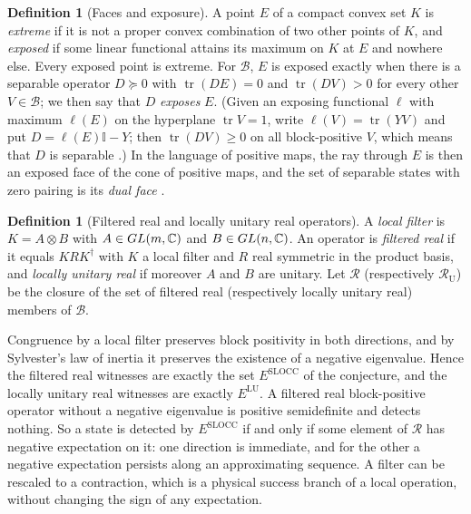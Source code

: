 \documentclass[11pt,a4paper]{article}
\theoremstyle{definition}\newtheorem{definition}[theorem]{Definition}\newtheorem*{conj}{Conjecture 9 of Shen, Chen and Bian}\newtheorem{remark}[theorem]{Remark}
\newcommand{\tr}{\operatorname{tr}}\newcommand{\im}{\operatorname{Im}}\newcommand{\adj}{\operatorname{adj}}\newcommand{\id}{\mathbb I}
\newcommand{\cB}{\mathcal B}\newcommand{\cR}{\mathcal R}\newcommand{\vecm}{\mathrm{vec}}
\begin{document}
\begin{definition}[Faces and exposure]
A point $E$ of a compact convex set $K$ is \emph{extreme} if it is not a proper convex combination of two other points of $K$, and \emph{exposed} if some linear functional attains its maximum on $K$ at $E$ and nowhere else. Every exposed point is extreme. For $\cB$, $E$ is exposed exactly when there is a separable operator $D\succeq0$ with $\tr(DE)=0$ and $\tr(DV)>0$ for every other $V\in\cB$; we then say that $D$ \emph{exposes} $E$. (Given an exposing functional $\ell$ with maximum $\ell(E)$ on the hyperplane $\tr V=1$, write $\ell(V)=\tr(YV)$ and put $D=\ell(E)\id-Y$; then $\tr(DV)\geq0$ on all block-positive $V$, which means that $D$ is separable \cite{horodecki}.) In the language of positive maps, the ray through $E$ is then an exposed face of the cone of positive maps, and the set of separable states with zero pairing is its \emph{dual face} \cite{hakye}.
\end{definition}

\begin{definition}[Filtered real and locally unitary real operators]
A \emph{local filter} is $K=A\otimes B$ with $A\in GL(m,\mathbb C)$ and $B\in GL(n,\mathbb C)$. An operator is \emph{filtered real} if it equals $KRK^\dagger$ with $K$ a local filter and $R$ real symmetric in the product basis, and \emph{locally unitary real} if moreover $A$ and $B$ are unitary. Let $\cR$ (respectively $\cR_{\mathrm U}$) be the closure of the set of filtered real (respectively locally unitary real) members of $\cB$.
\end{definition}

Congruence by a local filter preserves block positivity in both directions, and by Sylvester's law of inertia it preserves the existence of a negative eigenvalue. Hence the filtered real witnesses are exactly the set $E^{\mathrm{SLOCC}}$ of the conjecture, and the locally unitary real witnesses are exactly $E^{\mathrm{LU}}$. A filtered real block-positive operator without a negative eigenvalue is positive semidefinite and detects nothing. So a state is detected by $E^{\mathrm{SLOCC}}$ if and only if some element of $\cR$ has negative expectation on it: one direction is immediate, and for the other a negative expectation persists along an approximating sequence. A filter can be rescaled to a contraction, which is a physical success branch of a local operation, without changing the sign of any expectation.
\end{document}
